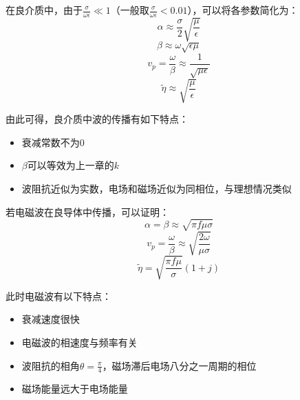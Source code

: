 \documentclass[UTF8,a4paper,11pt]{article}
\begin{document}
在良介质中，由于$\frac{\sigma}{\omega\epsilon}\ll1$（一般取$\frac{\sigma}{\omega\epsilon}<0.01$），可以将各参数简化为：
\begin{equation}
\alpha\approx\frac{\sigma}{2}\sqrt{\frac{\mu}{\epsilon}}
\end{equation}
\begin{equation}
\beta\approx\omega\sqrt{\epsilon\mu}
\end{equation}
\begin{equation}
v_p=\frac{\omega}{\beta}\approx\frac{1}{\sqrt{\mu\epsilon}}
\end{equation}
\begin{equation}
\widetilde{\eta}\approx\sqrt{\frac{\mu}{\epsilon}}
\end{equation}

由此可得，良介质中波的传播有如下特点：
\begin{itemize}
\item 衰减常数不为0
\item $\beta$可以等效为上一章的$k$
\item 波阻抗近似为实数，电场和磁场近似为同相位，与理想情况类似
\end{itemize}

若电磁波在良导体中传播，可以证明：
\begin{equation}
\alpha=\beta\approx\sqrt{\pi f\mu\sigma}
\end{equation}
\begin{equation}
v_p=\frac{\omega}{\beta}\approx\sqrt{\frac{2\omega}{\mu\sigma}}
\end{equation}
\begin{equation}
\widetilde{\eta}=\sqrt{\frac{\pi f\mu}{\sigma}}(1+j)
\end{equation}

此时电磁波有以下特点：
\begin{itemize}
\item 衰减速度很快
\item 电磁波的相速度与频率有关
\item 波阻抗的相角$\theta=\frac{\pi}{4}$，磁场滞后电场八分之一周期的相位
\item 磁场能量远大于电场能量
\end{itemize}
\end{document}

